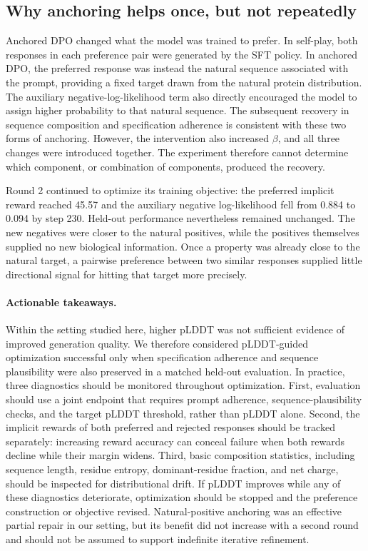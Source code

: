 \documentclass{article}
\begin{document}
\subsection{Why anchoring helps once, but not repeatedly}

Anchored DPO changed what the model was trained to prefer. In self-play, both
responses in each preference pair were generated by the SFT policy. In
anchored DPO, the preferred response was instead the natural sequence
associated with the prompt, providing a fixed target drawn from the natural
protein distribution. The auxiliary negative-log-likelihood term also directly
encouraged the model to assign higher probability to that natural sequence.
The subsequent recovery in sequence composition and specification adherence is
consistent with these two forms of anchoring. However, the intervention also
increased $\beta$, and all three changes were introduced together. The
experiment therefore cannot determine which component, or combination of
components, produced the recovery.

Round 2 continued to optimize its training objective: the preferred implicit
reward reached 45.57 and the auxiliary negative log-likelihood fell from 0.884
to 0.094 by step 230. Held-out performance nevertheless remained unchanged.
The new negatives were closer to the natural positives, while the positives
themselves supplied no new biological information. Once a property was already
close to the natural target, a pairwise preference between two similar
responses supplied little directional signal for hitting that target more
precisely. 

\paragraph{Actionable takeaways.}
Within the setting studied here, higher pLDDT was not sufficient evidence of improved generation quality. We therefore considered pLDDT-guided optimization successful only when specification adherence and sequence plausibility were also preserved in a matched held-out evaluation. In practice, three diagnostics should be monitored throughout optimization. First, evaluation should use a joint endpoint that requires prompt adherence, sequence-plausibility checks, and the target pLDDT threshold, rather than pLDDT alone. Second, the implicit rewards of both preferred and rejected responses should be tracked separately: increasing reward accuracy can conceal failure when both rewards decline while their margin widens. Third, basic composition statistics, including sequence length, residue entropy, dominant-residue fraction, and net charge, should be inspected for distributional drift. If pLDDT improves while any of these diagnostics deteriorate, optimization should be stopped and the preference construction or objective revised. Natural-positive anchoring was an effective partial repair in our setting, but its benefit did not increase with a second round and should not be assumed to support indefinite iterative refinement.
\end{document}
